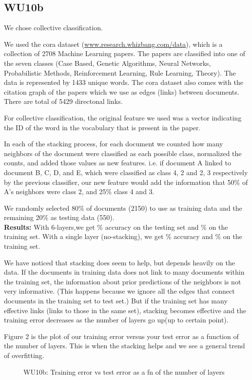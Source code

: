 \documentclass[a4paper,11pt]{article}
\begin{document}
\subsection{WU10b}
We chose collective classification. 

We used the cora dataset (\url{www.research.whizbang.com/data}), which is a collection of
2708 Machine Learning papers. The papers are classified into one of the seven
classes (Case Based, Genetic Algorithms, Neural Networks,
Probabilistic Methods, Reinforcement Learning, Rule Learning,
Theory). The data is represented by 1433 unique words.
The cora dataset also comes with the citation graph of the papers
which we use as edges (links) between documents. There are total of
5429 directonal links.

For collective classification, the original feature we used was a
vector indicating the ID of the word in the vocabulary that is present
in the paper.

In each of the stacking process, for each document we counted how many
neighbors of the document were classified as each possible class,
normalized the counts, and added those values as new features. i.e. if
document A linked to document B, C, D, and E, which were classified as
class 4, 2 and 2, 3 respectively by the previous classifier, our new feature would add the
information that 50\% of A's neighbors were class 2, and 25\% class 4
and 3. 

We randomly selected 80\% of documents (2150) to use as training data
and the remaining 20\% as testing data (550).\\

\textbf{Results:} With 6-layers,we get \% accuracy on the testing set
and \% on the training set. With a single layer (no-stacking), we get
\% accuracy and \% on the training set.

We have noticed that stacking does seem to help, but depends heavily on
the data. If the documents in training data does not link to many documents
within the training set, the information about prior predictions of the
neighbors is not very informative. (This happens because we ignore all
the edges that connect documents in the training set to test set.)
But if the training set has many effective links (links to those in
the same set), stacking becomes effective and the training
error decreases as the number of layers go up(up to certain point).

Figure 2 is the plot of our training error versus your test error as a
function of the number of layers. This is when the stacking helps and
we see a general trend of overfitting.
\begin{figure}[h!]
  \caption{WU10b: Training error vs test error as a fn of the number of layers }
  \centering
\end{figure}
\end{document}
